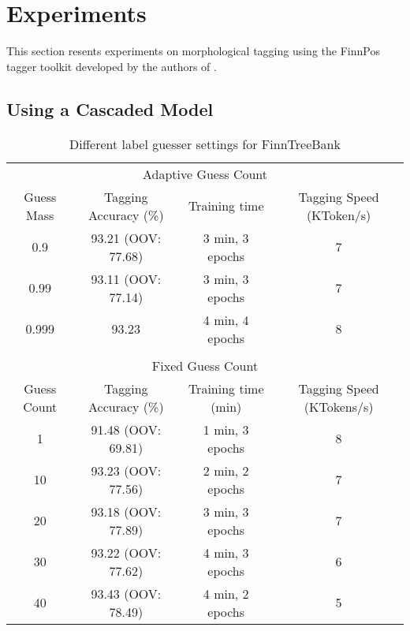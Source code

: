 \chapter{Experiments}

This section resents experiments on morphological tagging using the
FinnPos tagger toolkit developed by the authors of
\cite{Silfverberg2015}.

\section{Using a Cascaded Model}

\begin{table}[htb!]
\begin{center}
\begin{tabular}{cccc}
\multicolumn{4}{c}{Adaptive Guess Count}\\
Guess Mass & Tagging Accuracy (\%) & Training time & Tagging Speed (KToken/s)\\
\hline
0.9        & 93.21 (OOV: 77.68)& 3 min, 3 epochs &   7          \\
0.99       & 93.11 (OOV: 77.14)& 3 min, 3 epochs & 7            \\
0.999      & 93.23            & 4 min, 4 epochs            & 8            \\
\hline
           &                  &               &               \\
\multicolumn{4}{c}{Fixed Guess Count}\\
Guess Count & Tagging Accuracy (\%) & Training time (min) & Tagging Speed (KTokens/s) \\
\hline
1        & 91.48 (OOV: 69.81)           & 1 min, 3 epochs            & 8            \\
10       & 93.23 (OOV: 77.56)           & 2 min, 2 epochs            & 7            \\
20       & 93.18 (OOV: 77.89)           & 3 min, 3 epochs            & 7            \\
30       & 93.22 (OOV: 77.62)           & 4 min, 3 epochs            & 6            \\
40       & 93.43 (OOV: 78.49)           & 4 min, 2 epochs            & 5            \\
\hline
\end{tabular}
\caption{Different label guesser settings for FinnTreeBank}
\end{center}
\end{table}


